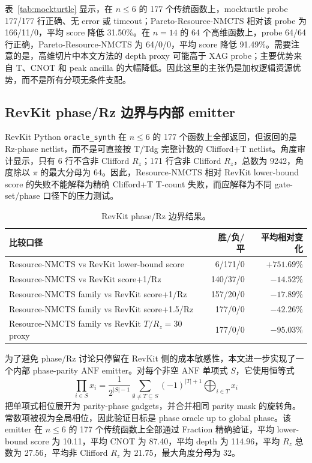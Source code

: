 \documentclass[UTF8,fontset=macnew,11pt]{ctexart}
\newcommand{\method}{Resource-NMCTS}
\newcommand{\anf}{\ensuremath{\mathrm{ANF}}}
\newcommand{\rz}{\ensuremath{R_z}}
\begin{document}
表~\ref{tab:mockturtle} 显示，在 $n\leq6$ 的 177 个传统函数上，mockturtle probe 177/177 行正确、无 error 或 timeout；Pareto-\method{} 相对该 probe 为 166/11/0，平均 score 降低 31.50\%。在 $n=14$ 的 64 个高维函数上，probe 64/64 行正确，Pareto-\method{} 为 64/0/0，平均 score 降低 91.49\%。需要注意的是，高维切片中本文方法的 depth proxy 可能高于 XAG probe；主要优势来自 T、CNOT 和 peak ancilla 的大幅降低。因此这里的主张仍是加权逻辑资源优势，而不是所有分项无条件支配。

\subsection{RevKit phase/Rz 边界与内部 emitter}

RevKit Python \texttt{oracle\_synth} 在 $n\leq6$ 的 177 个函数上全部返回，但返回的是 Rz-phase netlist，而不是可直接按 T/Tdg 完整计数的 Clifford+T netlist。角度审计显示，只有 6 行不含非 Clifford \rz{}；171 行含非 Clifford \rz{}，总数为 9242，角度除以 $\pi$ 的最大分母为 64。因此，\method{} 相对 RevKit lower-bound score 的失败不能解释为精确 Clifford+T T-count 失败，而应解释为不同 gate-set/phase 口径下的压力测试。

\begin{table}[H]
\centering
\small
\caption{RevKit phase/Rz 边界结果。}
\label{tab:rz-boundary}
\begin{tabularx}{\linewidth}{>{\raggedright\arraybackslash}Xrr}
\toprule
比较口径 & 胜/负/平 & 平均相对变化 \\
\midrule
\method{} vs RevKit lower-bound score & 6/171/0 & $+751.69\%$ \\
\method{} vs RevKit score+1/Rz & 140/37/0 & $-14.52\%$ \\
Resource-NMCTS family vs RevKit score+1/Rz & 157/20/0 & $-17.89\%$ \\
Resource-NMCTS family vs RevKit score+1.5/Rz & 177/0/0 & $-42.26\%$ \\
Resource-NMCTS family vs RevKit $T/R_z=30$ proxy & 177/0/0 & $-95.03\%$ \\
\bottomrule
\end{tabularx}
\end{table}

为了避免 phase/Rz 讨论只停留在 RevKit 侧的成本敏感性，本文进一步实现了一个内部 phase-parity \anf{} emitter。对每个非空 \anf{} 单项式 $S$，它使用恒等式
\begin{equation}
  \prod_{i\in S}x_i =
  \frac{1}{2^{|S|-1}}\sum_{\emptyset\neq T\subseteq S}(-1)^{|T|+1}
  \bigoplus_{i\in T}x_i
  \label{eq:phase-parity}
\end{equation}
把单项式相位展开为 parity-phase gadgets，并合并相同 parity mask 的旋转角。常数项被视为全局相位，因此验证目标是 phase oracle up to global phase。该 emitter 在 $n\leq6$ 的 177 个传统函数上全部通过 Fraction 精确验证，平均 lower-bound score 为 10.11，平均 CNOT 为 87.40，平均 depth 为 114.96，平均 \rz{} 总数为 27.56，平均非 Clifford \rz{} 为 21.75，最大角度分母为 32。
\end{document}
